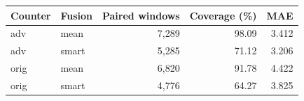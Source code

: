 \begin{tabular}{llrrr}\toprule Counter & Fusion & Paired windows & Coverage (\%) & MAE\\\midrule
adv & mean & 7,289 & 98.09 & 3.412\\
adv & smart & 5,285 & 71.12 & 3.206\\
orig & mean & 6,820 & 91.78 & 4.422\\
orig & smart & 4,776 & 64.27 & 3.825\\
\bottomrule\end{tabular}